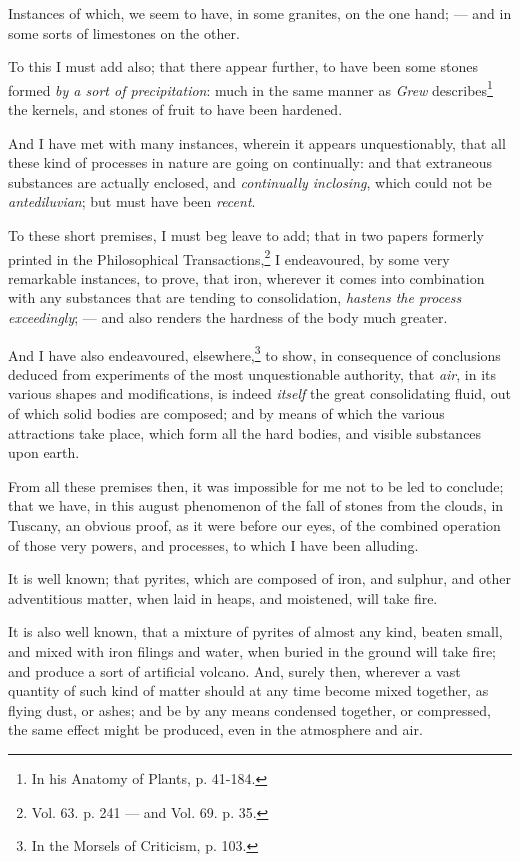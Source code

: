 \documentclass[a4paper, 12pt, oneside]{article}
\begin{document}
Instances of which, we seem to have, in some granites, on the one hand; --- and in some sorts of limestones on the other.

To this I must add also; that there appear further, to have been some stones formed \emph{by a sort of precipitation}: much in the same manner as \emph{Grew} describes\footnote{In his Anatomy of Plants, p. 41-184.} the kernels, and stones of fruit to have been hardened.

And I have met with many instances, wherein it appears unquestionably, that all these kind of processes in nature are going on continually: and that extraneous substances are actually enclosed, and \emph{continually inclosing}, which could not be \emph{antediluvian}; but must have been \emph{recent}.

To these short premises, I must beg leave to add; that in two papers formerly printed in the Philosophical Transactions,\footnote{Vol. 63. p. 241 --- and Vol. 69. p. 35.} I endeavoured, by some very remarkable instances, to prove, that iron, wherever it comes into combination with any substances that are tending to consolidation, \emph{hastens the process exceedingly}; --- and also renders the hardness of the body much greater.

And I have also endeavoured, elsewhere,\footnote{In the Morsels of Criticism, p. 103.} to show, in consequence of conclusions deduced from experiments of the most unquestionable authority, that \emph{air}, in its various shapes and modifications, is indeed \emph{itself} the great consolidating fluid, out of which solid bodies are composed; and by means of which the various attractions take place, which form all the hard bodies, and visible substances upon earth.

From all these premises then, it was impossible for me not to be led to conclude; that we have, in this august phenomenon of the fall of stones from the clouds, in Tuscany, an obvious proof, as it were before our eyes, of the combined operation of those very powers, and processes, to which I have been alluding.

It is well known; that pyrites, which are composed of iron, and sulphur, and other adventitious matter, when laid in heaps, and moistened, will take fire.

It is also well known, that a mixture of pyrites of almost any kind, beaten small, and mixed with iron filings and water, when buried in the ground will take fire; and produce a sort of artificial volcano. And, surely then, wherever a vast quantity of such kind of matter should at any time become mixed together, as flying dust, or ashes; and be by any means condensed together, or compressed, the same effect might be produced, even in the atmosphere and air.
\end{document}
